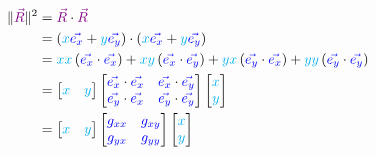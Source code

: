 \begin{align*}
    \|\begingroup\color{violet}\vec{R}\endgroup \|^2 &=  \begingroup\color{violet}\vec{R}\endgroup \cdot \begingroup\color{violet}\vec{R}\endgroup\\
    &= \left(\begingroup\color{cyan}x\endgroup\begingroup\color{blue}\vec{e_x}\endgroup + \begingroup\color{cyan}y\endgroup\begingroup\color{blue}\vec{e_y}\endgroup\right) \cdot
    \left(\begingroup\color{cyan}x\endgroup\begingroup\color{blue}\vec{e_x}\endgroup + \begingroup\color{cyan}y\endgroup\begingroup\color{blue}\vec{e_y}\endgroup\right)\\
    &= \begingroup\color{cyan}xx\endgroup\left(\begingroup\color{blue}\vec{e_x}\endgroup \cdot \begingroup\color{blue}\vec{e_x}\endgroup\right) 
    + \begingroup\color{cyan}xy\endgroup\left(\begingroup\color{blue}\vec{e_x}\endgroup \cdot \begingroup\color{blue}\vec{e_y}\endgroup\right) 
    + \begingroup\color{cyan}yx\endgroup\left(\begingroup\color{blue}\vec{e_y}\endgroup \cdot \begingroup\color{blue}\vec{e_x}\endgroup\right) 
    + \begingroup\color{cyan}yy\endgroup\left(\begingroup\color{blue}\vec{e_y}\endgroup \cdot \begingroup\color{blue}\vec{e_y}\endgroup\right)\\
    &= \begin{bmatrix}
        \begingroup\color{cyan}x\endgroup&
        \begingroup\color{cyan}y\endgroup
    \end{bmatrix}
    \begin{bmatrix}
        \begingroup\color{blue}\vec{e_x}\endgroup \cdot \begingroup\color{blue}\vec{e_x}\endgroup & \begingroup\color{blue}\vec{e_x}\endgroup \cdot \begingroup\color{blue}\vec{e_y}\endgroup\\
        \begingroup\color{blue}\vec{e_y}\endgroup \cdot \begingroup\color{blue}\vec{e_x}\endgroup & \begingroup\color{blue}\vec{e_y}\endgroup \cdot \begingroup\color{blue}\vec{e_y}\endgroup
    \end{bmatrix}
    \begin{bmatrix}
        \begingroup\color{cyan}x\endgroup\\
        \begingroup\color{cyan}y\endgroup
    \end{bmatrix}\\
    &= \begin{bmatrix}
        \begingroup\color{cyan}x\endgroup&
        \begingroup\color{cyan}y\endgroup
    \end{bmatrix}
    \begin{bmatrix}
        \begingroup\color{blue}g_{xx}\endgroup & \begingroup\color{blue}g_{xy}\endgroup \\
        \begingroup\color{blue}g_{yx}\endgroup & \begingroup\color{blue}g_{yy}\endgroup  
    \end{bmatrix}
    \begin{bmatrix}
        \begingroup\color{cyan}x\endgroup\\
        \begingroup\color{cyan}y\endgroup
    \end{bmatrix}
\end{align*}


